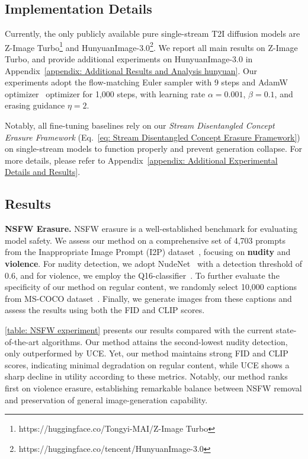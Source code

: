 
\subsection{Implementation Details}
\label{sec: Implementation Details}
Currently, the only publicly available pure single-stream T2I diffusion models are Z-Image Turbo\footnote{https://huggingface.co/Tongyi-MAI/Z-Image Turbo} and HunyuanImage-3.0\footnote{https://huggingface.co/tencent/HunyuanImage-3.0}. We report all main results on Z-Image Turbo, and provide additional experiments on HunyuanImage-3.0 in Appendix~\ref{appendix: Additional Results and Analysis hunyuan}. Our experiments adopt the flow-matching Euler sampler with 9 steps and AdamW optimizer~\cite{adamw}  optimizer for 1,000 steps, with learning rate $\alpha = 0.001$, $\beta = 0.1$, and erasing guidance $\eta = 2$. 

Notably, all fine-tuning baselines rely on our \emph{Stream Disentangled Concept Erasure Framework} (Eq.~\ref{eq: Stream Disentangled Concept Erasure Framework}) on single-stream models to function properly and prevent generation collapse. For more details, please refer to Appendix~\ref{appendix: Additional Experimental Details and Results}.

\subsection{Results}

\textbf{NSFW Erasure.}
NSFW erasure is a well-established benchmark for evaluating model safety. We assess our method on a comprehensive set of 4,703 prompts from the Inappropriate Image Prompt (I2P) dataset~\citep{sld}, focusing on \textbf{nudity} and \textbf{violence}. For nudity detection, we adopt NudeNet~\cite{bedapudi2019nudenet} with a detection threshold of 0.6, and for violence, we employ the Q16-classifier~\cite{q16-classifier}. To further evaluate the specificity of our method on regular content, we randomly select 10,000 captions from MS-COCO dataset~\cite{mscoco}. Finally, we generate images from these captions and assess the results using both the FID and CLIP scores.

\cref{table: NSFW experiment} presents our results compared with the current state-of-the-art algorithms. Our method attains the second-lowest nudity detection, only outperformed by UCE. Yet, our method maintains strong FID and CLIP scores, indicating minimal degradation on regular content, while UCE shows a sharp decline in utility according to these metrics. Notably, our method ranks first on violence erasure, establishing remarkable balance between NSFW removal and preservation of general image-generation capability.



